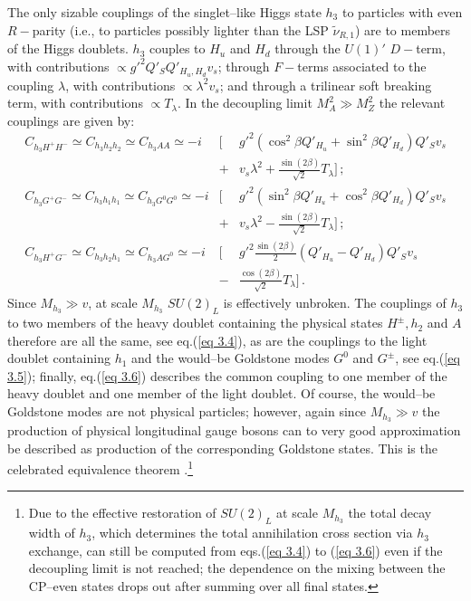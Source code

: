 \documentclass[a4paper,11pt]{article}
\begin{document}
The only sizable couplings of the singlet--like Higgs state $h_3$ to
particles with even $R-$parity (i.e., to particles possibly lighter
than the LSP $\tilde \nu_{R,1}$) are to members of the Higgs doublets.
$h_3$ couples to $H_u$ and $H_d$ through the $U(1)'$ $D-$term, with
contributions $\propto g'^2 Q'_S Q'_{H_u, H_d} v_s$; through $F-$terms
associated to the coupling $\lambda$, with contributions
$\propto \lambda^2 v_s$; and through a trilinear soft breaking term,
with contributions $\propto T_\lambda$. In the decoupling limit
$M_A^2 \gg M_Z^2$ the relevant couplings are given by:
%
\begin{eqnarray}
C_{h_3 H^+ H^-} \simeq C_{h_3 h_2 h_2 } \simeq C_{h_3 A A} \simeq - i &\Big[& 
g'^2 \left( \cos^2\beta Q'_{H_u} + \sin^2\beta Q'_{H_d} \right) Q'_Sv_s   
\nonumber \\
&+& v_s \lambda^2 + \frac{\sin(2\beta)} {\sqrt{2}} T_\lambda \Big]\,;
 \label{eq 3.4}    \\
%
C_{h_3 G^+ G^-} \simeq C_{h_3 h_1 h_1} \simeq C_{h_3 G^0 G^0 } \simeq -i  &\Big[& 
g'^2 \left( \sin^2\beta Q'_{H_u} + \cos^2\beta Q'_{H_d} \right) Q'_S v_s  
\nonumber \\
& + & v_s \lambda^2 - \frac{\sin(2\beta)}{\sqrt{2}} T_\lambda \Big]\,;
 \label{eq 3.5} \\
%
C_{h_3 H^+ G^-} \simeq C_{h_3 h_2 h_1} \simeq C_{h_3 A G^0} \simeq -i &\Big[& 
g'^2 \frac{ \sin(2\beta)} {2} \left( Q'_{H_u} - Q'_{H_d} \right) Q'_S v_s 
\nonumber \\
& - &\frac{\cos(2\beta)}{\sqrt{2}} T_\lambda \Big]\,. \label{eq 3.6}
\end{eqnarray}
%
Since $M_{h_3} \gg v$, at scale $M_{h_3}$ $SU(2)_{L}$ is effectively
unbroken. The couplings of $h_3$ to two members of the heavy doublet
containing the physical states $H^\pm, h_2$ and $A$ therefore are
all the same, see eq.(\ref{eq 3.4}), as are the couplings to the light
doublet containing $h_1$ and the would--be Goldstone modes $G^0$ and
$G^\pm$, see eq.(\ref{eq 3.5}); finally, eq.(\ref{eq 3.6}) describes
the common coupling to one member of the heavy doublet and one member
of the light doublet. Of course, the would--be Goldstone modes are not
physical particles; however, again since $M_{h_3} \gg v$ the
production of physical longitudinal gauge bosons can to very good
approximation be described as production of the corresponding
Goldstone states. This is the celebrated equivalence theorem
\cite{Cornwall:1974km}.\footnote{Due to the effective restoration
of $SU(2)_{L}$ at scale $M_{h_3}$ the total decay width of $h_3$, which
determines the total annihilation cross section via $h_3$ exchange,
can still be computed from eqs.(\ref{eq 3.4}) to (\ref{eq 3.6}) even
if the decoupling limit is not reached; the dependence on the
mixing between the CP--even states drops out after summing over
all final states.}
\end{document}
